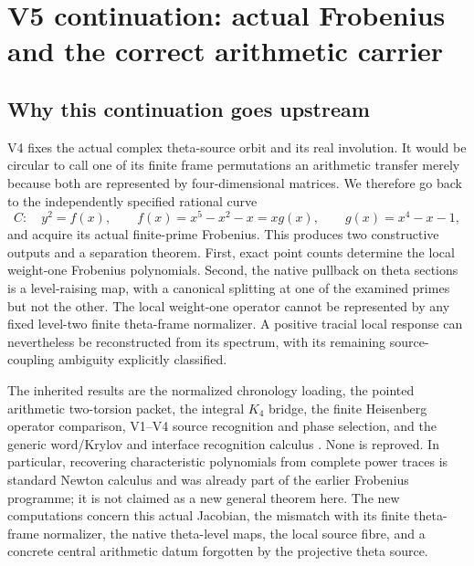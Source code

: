 \documentclass[11pt]{article}
\theoremstyle{definition}
\theoremstyle{remark}
\begin{document}
\section{V5 continuation: actual Frobenius and the correct arithmetic carrier}
\label{sec:v5-context}

\subsection{Why this continuation goes upstream}
V4 fixes the actual complex theta-source orbit and its real involution. It
would be circular to call one of its finite frame permutations an arithmetic
transfer merely because both are represented by four-dimensional matrices.
We therefore go back to the independently specified rational curve
\[
 C:\quad y^2=f(x),\qquad f(x)=x^5-x^2-x=xg(x),\qquad g(x)=x^4-x-1,
\]
and acquire its actual finite-prime Frobenius. This produces two constructive
outputs and a separation theorem. First, exact point counts determine the
local weight-one Frobenius polynomials. Second, the native pullback on theta
sections is a level-raising map, with a canonical splitting at one of the
examined primes but not the other. The local weight-one operator cannot be
represented by any fixed level-two finite theta-frame normalizer. A positive
tracial local response can nevertheless be reconstructed from its spectrum,
with its remaining source-coupling ambiguity explicitly classified.

The inherited results are the normalized chronology loading, the pointed
arithmetic two-torsion packet, the integral $K_4$ bridge, the finite
Heisenberg operator comparison, V1--V4 source recognition and phase
selection, and the generic word/Krylov and interface recognition calculus
\cite{GT77,Arithmetic,AD9}. None is reproved. In particular, recovering
characteristic polynomials from complete power traces is standard Newton
calculus and was already part of the earlier Frobenius programme; it is not
claimed as a new general theorem here. The new computations concern this
actual Jacobian, the mismatch with its finite theta-frame normalizer, the
native theta-level maps, the local source fibre, and a concrete central
arithmetic datum forgotten by the projective theta source.
\end{document}
